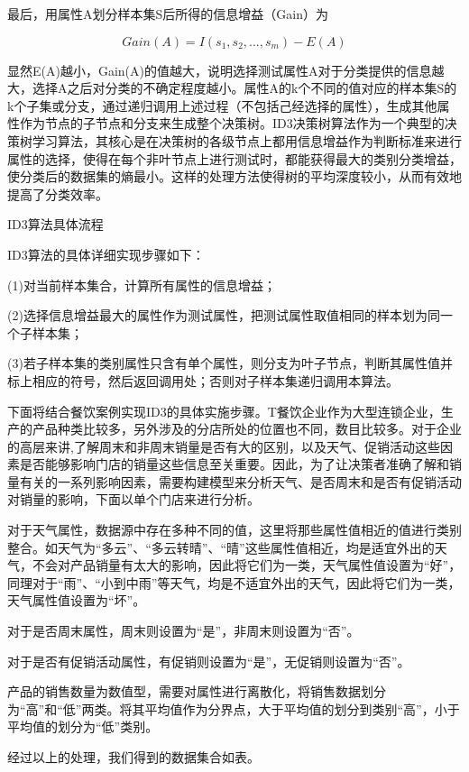 最后，用属性A划分样本集S后所得的信息增益（Gain）为

\begin{equation}
 Gain(A)=I(s_1,s_2,...,s_m)-E(A) 
\end{equation}

显然E(A)越小，Gain(A)的值越大，说明选择测试属性A对于分类提供的信息越大，选择A之后对分类的不确定程度越小。属性A的k个不同的值对应的样本集S的k个子集或分支，通过递归调用上述过程（不包括己经选择的属性），生成其他属性作为节点的子节点和分支来生成整个决策树。ID3决策树算法作为一个典型的决策树学习算法，其核心是在决策树的各级节点上都用信息增益作为判断标准来进行属性的选择，使得在每个非叶节点上进行测试时，都能获得最大的类别分类增益，使分类后的数据集的熵最小。这样的处理方法使得树的平均深度较小，从而有效地提高了分类效率。

ID3算法具体流程

ID3算法的具体详细实现步骤如下：

(1)对当前样本集合，计算所有属性的信息增益；

(2)选择信息增益最大的属性作为测试属性，把测试属性取值相同的样本划为同一个子样本集；

(3)若子样本集的类别属性只含有单个属性，则分支为叶子节点，判断其属性值并标上相应的符号，然后返回调用处；否则对子样本集递归调用本算法。

下面将结合餐饮案例实现ID3的具体实施步骤。T餐饮企业作为大型连锁企业，生产的产品种类比较多，另外涉及的分店所处的位置也不同，数目比较多。对于企业的高层来讲,了解周末和非周末销量是否有大的区别，以及天气、促销活动这些因素是否能够影响门店的销量这些信息至关重要。因此，为了让决策者准确了解和销量有关的一系列影响因素，需要构建模型来分析天气、是否周末和是否有促销活动对销量的影响，下面以单个门店来进行分析。

对于天气属性，数据源中存在多种不同的值，这里将那些属性值相近的值进行类别整合。如天气为“多云”、“多云转晴”、“晴”这些属性值相近，均是适宜外出的天气，不会对产品销量有太大的影响，因此将它们为一类，天气属性值设置为“好”，同理对于“雨”、“小到中雨”等天气，均是不适宜外出的天气，因此将它们为一类，天气属性值设置为“坏”。

对于是否周末属性，周末则设置为“是”，非周末则设置为“否”。

对于是否有促销活动属性，有促销则设置为“是”，无促销则设置为“否”。

产品的销售数量为数值型，需要对属性进行离散化，将销售数据划分为“高”和“低”两类。将其平均值作为分界点，大于平均值的划分到类别“高”，小于平均值的划分为“低”类别。

经过以上的处理，我们得到的数据集合如表。

